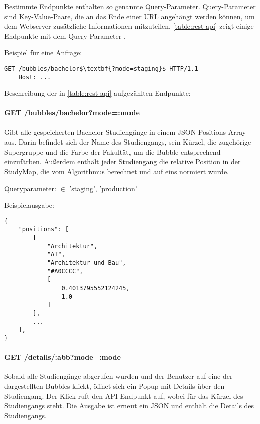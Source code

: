 Bestimmte Endpunkte enthalten so genannte Query-Parameter. Query-Parameter sind Key-Value-Paare, die an das Ende einer URL angehängt werden können, um dem Webserver zusätzliche Informationen mitzuteilen. \parencite{branch_query_2024} \autoref{table:rest-api} zeigt einige Endpunkte mit dem Query-Parameter .


\noindent
\begin{minipage}{\linewidth}
Beispiel für eine Anfrage:
\begin{lstlisting}[style=Python, mathescape=true]
    GET /bubbles/bachelor$\textbf{?mode=staging}$ HTTP/1.1
    Host: ...
\end{lstlisting}
\end{minipage}

\noindent
Beschreibung der in \autoref{table:rest-api} aufgezählten Endpunkte:

\paragraph*{GET /bubbles/bachelor?mode=:mode}
\vspace{-1.0em}
Gibt alle gespeicherten Bachelor-Studiengänge in einem JSON-Positions-Array aus. Darin befindet sich der Name des Studiengangs, sein Kürzel, die zugehörige Supergruppe und die Farbe der Fakultät, um die Bubble entsprechend einzufärben. Außerdem enthält jeder Studiengang die relative Position in der StudyMap, die vom Algorithmus berechnet und auf eins normiert wurde.

\noindent
Queryparameter:  $\in$ {'staging', 'production'}

\noindent
\begin{minipage}{\linewidth}
Beispielausgabe:
\begin{lstlisting}[style=Python]
{
    "positions": [
        [
            "Architektur",
            "AT",
            "Architektur und Bau",
            "#A0CCCC",
            [
                0.4013795552124245,
                1.0
            ]
        ],
        ...
    ],
}
\end{lstlisting}
\end{minipage}

\paragraph*{GET /details/:abb?mode=:mode}
\vspace{-1.0em}
Sobald alle Studiengänge abgerufen wurden und der Benutzer auf eine der dargestellten Bubbles klickt, öffnet sich ein Popup mit Details über den Studiengang. Der Klick ruft den API-Endpunkt  auf, wobei  für das Kürzel des Studiengangs steht. Die Ausgabe ist erneut ein JSON und enthält die Details des Studiengangs.

